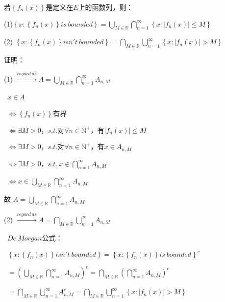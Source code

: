 \begin{eg}
   若$\left\{f_{n}(x)\right\}$是定义在$E$上的函数列，则：
\par (1)$\left\{ x : \left\{f_{n}(x)\right\} is \ bounded \right\} = \bigcup \limits_{M \in \mathbb{R}}\bigcap \limits_{n=1}^{\infty}\left\{x : \left\lvert f_{n}(x)\right\rvert \leqslant M\right\} $
\par (2) $\left\{ x : \left\{f_{n}(x)\right\} isn't \ bounded \right\} = \bigcap \limits_{M \in \mathbb{R}}\bigcup \limits_{n=1}^{\infty}\left\{x : \left\lvert f_{n}(x)\right\rvert > M\right\} $  
\end{eg}
\noindent 证明：
\par (1) $\xrightarrow{regard \ as} A = \bigcup \limits_{M \in \mathbb{R}}\bigcap \limits_{n=1}^{\infty}A_{n,M}$
\par \quad \ $x \in A$
\par \quad \ $\Leftrightarrow \left\{f_{n}(x)\right\}$有界
\par \quad \ $\Leftrightarrow \exists M > 0$，$s.t.$对$\forall n \in \mathbb{N}^{+}$，有$\left\lvert f_{n}(x)\right\rvert \leqslant M$
\par \quad \ $\Leftrightarrow \exists M > 0$，$s.t.$对$\forall n \in \mathbb{N}^{+}$，有$x \in A_{n,M}$
\par \quad \ $\Leftrightarrow \exists M > 0$，$s.t. \ x \in \bigcap \limits_{n=1}^{\infty}A_{n,M}$
\par \quad \ $\Leftrightarrow x \in \bigcup \limits_{M \in \mathbb{R}} \bigcap \limits_{n=1}^{\infty}A_{n,M}$
\par \quad 故 $A = \bigcup \limits_{M \in \mathbb{R}}\bigcap \limits_{n=1}^{\infty}A_{n,M}$
\par (2) $\xrightarrow{regard \ as} A = \bigcap \limits_{M \in \mathbb{R}}\bigcup \limits_{n=1}^{\infty}A_{n,M}$
\par \quad \ $De \ Morgan$公式：
\par \quad \ $\left\{ x : \left\{f_{n}(x)\right\} isn't \ bounded \right\} = \left\{ x : \left\{f_{n}(x)\right\} is \ bounded \right\}^{c}$
\par \quad \ $= \left(\bigcup \limits_{M \in \mathbb{R}}\bigcap \limits_{n=1}^{\infty}A_{n,M}\right)^{c} = \bigcap \limits_{M \in \mathbb{R}}\left(\bigcap \limits_{n=1}^{\infty}A_{n,M}\right)^{c} $
\par \quad \ $=\bigcap \limits_{M \in \mathbb{R}}\bigcup \limits_{n=1}^{\infty}A_{n,M}^{c} = \bigcap \limits_{M \in \mathbb{R}}\bigcup \limits_{n=1}^{\infty}\left\{x : \left\lvert f_{n}(x)\right\rvert > M\right\}$

